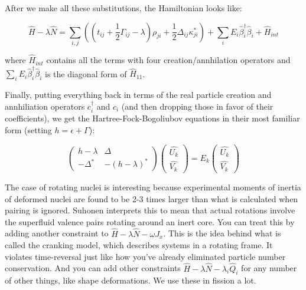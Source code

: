 After we make all these substitutions, the Hamiltonian looks like:

\begin{equation}
\hat{H}-\lambda\hat{N} = \sum\limits_{i,j}\left(\left(t_{ij} + \frac{1}{2}\Gamma_{ij} - \lambda \right) \rho_{ji} + \frac{1}{2}\Delta_{ij}\kappa_{ji}^* \right) + \sum_{i}E_i \hat{\beta}_i^\dagger\hat{\beta}_i + \hat{H}_{int}
\end{equation}

\noindent where $\hat{H}_{int}$ contains all the terms with four creation/annhilation operators and $\sum_{i}E_i \hat{\beta}_i^\dagger\hat{\beta}_i$ is the diagonal form of $\hat{H}_{11}$.

Finally, putting everything back in terms of the real particle creation and annhiliation operators $c_i^\dagger$ and $c_i$ (and then dropping those in favor of their coefficients), we get the Hartree-Fock-Bogoliubov equations in their most familiar form (setting $h=\epsilon+\Gamma$):

\begin{equation}
\left(\begin{array}{cc}
h-\lambda & \Delta \\
-\Delta^* & -(h-\lambda)^*
\end{array}\right) \left(\begin{array}{c}
\hat{U_k} \\
\hat{V_k}
\end{array}\right)
= E_k\left(\begin{array}{c}
\hat{U_k} \\
\hat{V_k}
\end{array}\right)
\end{equation}

The case of rotating nuclei is interesting because experimental moments of inertia of deformed nuclei are found to be 2-3 times larger than what is calculated when pairing is ignored. Suhonen interprets this to mean that actual rotations involve the superfluid valence pairs rotating around an inert core. You can treat this by adding another constraint to $\hat{H} - \lambda\hat{N} - \omega J_x$. This is the idea behind what is called the cranking model, which describes systems in a rotating frame. It violates time-reversal just like how you've already eliminated particle number conservation. And you can add other constraints $\hat{H} - \lambda\hat{N} - \lambda_i \hat{Q}_i$ for any number of other things, like shape deformations. We use these in fission a lot.

%
